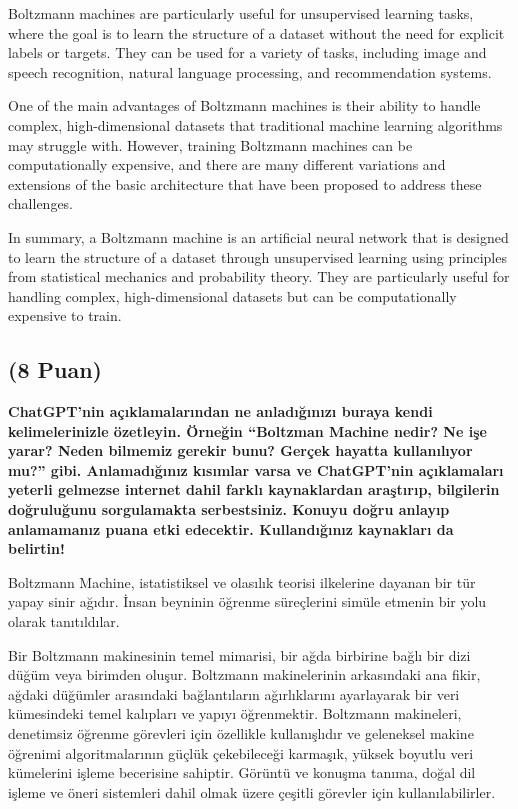 \documentclass[11pt]{article}
\begin{document}
Boltzmann machines are particularly useful for unsupervised learning tasks, where the goal is to learn the structure of a dataset without the need for explicit labels or targets. They can be used for a variety of tasks, including image and speech recognition, natural language processing, and recommendation systems.

One of the main advantages of Boltzmann machines is their ability to handle complex, high-dimensional datasets that traditional machine learning algorithms may struggle with. However, training Boltzmann machines can be computationally expensive, and there are many different variations and extensions of the basic architecture that have been proposed to address these challenges.

In summary, a Boltzmann machine is an artificial neural network that is designed to learn the structure of a dataset through unsupervised learning using principles from statistical mechanics and probability theory. They are particularly useful for handling complex, high-dimensional datasets but can be computationally expensive to train.


\subsection{(8 Puan)} \textbf{ChatGPT’nin açıklamalarından ne anladığınızı buraya kendi kelimelerinizle özetleyin. Örneğin ``Boltzman Machine nedir? Ne işe yarar? Neden bilmemiz gerekir bunu? Gerçek hayatta kullanılıyor mu?'' gibi. Anlamadığınız kısımlar varsa ve ChatGPT’nin açıklamaları yeterli gelmezse internet dahil farklı kaynaklardan araştırıp, bilgilerin doğruluğunu sorgulamakta serbestsiniz. Konuyu doğru anlayıp anlamamanız puana etki edecektir. Kullandığınız kaynakları da belirtin!}

Boltzmann Machine, istatistiksel ve olasılık teorisi ilkelerine dayanan bir tür yapay sinir ağıdır. İnsan beyninin öğrenme süreçlerini simüle etmenin bir yolu olarak tanıtıldılar.

Bir Boltzmann makinesinin temel mimarisi, bir ağda birbirine bağlı bir dizi düğüm veya birimden oluşur. Boltzmann makinelerinin arkasındaki ana fikir, ağdaki düğümler arasındaki bağlantıların ağırlıklarını ayarlayarak bir veri kümesindeki temel kalıpları ve yapıyı öğrenmektir. Boltzmann makineleri, denetimsiz öğrenme görevleri için özellikle kullanışlıdır ve geleneksel makine öğrenimi algoritmalarının güçlük çekebileceği karmaşık, yüksek boyutlu veri kümelerini işleme becerisine sahiptir. Görüntü ve konuşma tanıma, doğal dil işleme ve öneri sistemleri dahil olmak üzere çeşitli görevler için kullanılabilirler.
\end{document}
